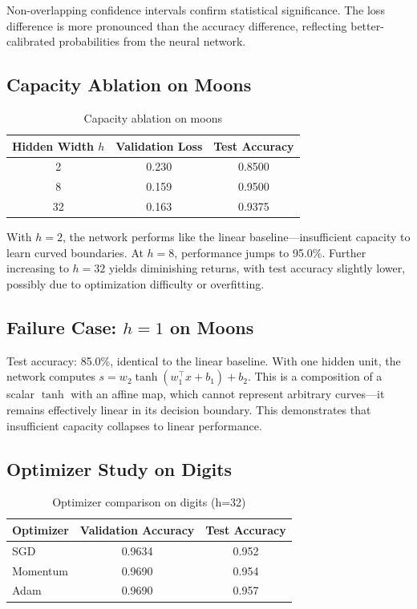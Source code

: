 \documentclass[sigconf,screen,nonacm,nofonts]{acmart}
\begin{document}
Non-overlapping confidence intervals confirm statistical significance. The loss difference is more pronounced than the accuracy difference, reflecting better-calibrated probabilities from the neural network.

\subsection{Capacity Ablation on Moons}
\begin{table}[htbp]
\centering
\caption{Capacity ablation on moons}
\label{tab:capacity_ablation}
\begin{tabular}{ccc}
\toprule
Hidden Width \(h\) & Validation Loss & Test Accuracy \\
\midrule
2 & 0.230 & 0.8500 \\
8 & 0.159 & 0.9500 \\
32 & 0.163 & 0.9375 \\
\bottomrule
\end{tabular}
\end{table}

With \(h=2\), the network performs like the linear baseline—insufficient capacity to learn curved boundaries. At \(h=8\), performance jumps to 95.0\%. Further increasing to \(h=32\) yields diminishing returns, with test accuracy slightly lower, possibly due to optimization difficulty or overfitting.

\subsection{Failure Case: \(h=1\) on Moons}
Test accuracy: 85.0\%, identical to the linear baseline. With one hidden unit, the network computes \(s = w_2 \tanh(w_1^\top x + b_1) + b_2\). This is a composition of a scalar \(\tanh\) with an affine map, which cannot represent arbitrary curves—it remains effectively linear in its decision boundary. This demonstrates that insufficient capacity collapses to linear performance.

\subsection{Optimizer Study on Digits}
\begin{table}[htbp]
\centering
\caption{Optimizer comparison on digits (h=32)}
\label{tab:optimizer_comparison}
\begin{tabular}{lcc}
\toprule
Optimizer & Validation Accuracy & Test Accuracy \\
\midrule
SGD & 0.9634 & 0.952 \\
Momentum & 0.9690 & 0.954 \\
Adam & 0.9690 & 0.957 \\
\bottomrule
\end{tabular}
\end{table}
\end{document}
